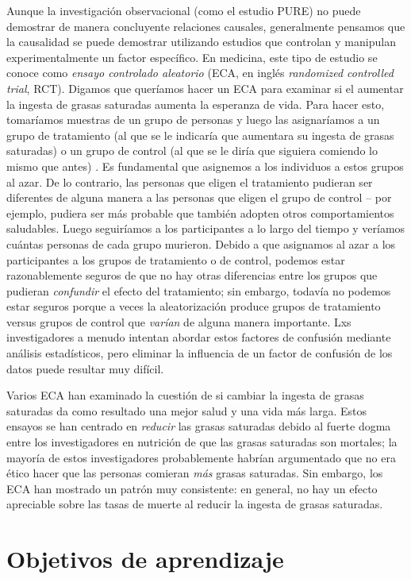 \documentclass[
  12pt,
]{book}
\begin{document}
Aunque la investigación observacional (como el estudio PURE) no puede demostrar de manera concluyente relaciones causales, generalmente pensamos que la causalidad se puede demostrar utilizando estudios que controlan y manipulan experimentalmente un factor específico. En medicina, este tipo de estudio se conoce como \emph{ensayo controlado aleatorio} (ECA, en inglés \emph{randomized controlled trial}, RCT). Digamos que queríamos hacer un ECA para examinar si el aumentar la ingesta de grasas saturadas aumenta la esperanza de vida. Para hacer esto, tomaríamos muestras de un grupo de personas y luego las asignaríamos a un grupo de tratamiento (al que se le indicaría que aumentara su ingesta de grasas saturadas) o un grupo de control (al que se le diría que siguiera comiendo lo mismo que antes) . Es fundamental que asignemos a los individuos a estos grupos al azar. De lo contrario, las personas que eligen el tratamiento pudieran ser diferentes de alguna manera a las personas que eligen el grupo de control -- por ejemplo, pudiera ser más probable que también adopten otros comportamientos saludables. Luego seguiríamos a los participantes a lo largo del tiempo y veríamos cuántas personas de cada grupo murieron. Debido a que asignamos al azar a los participantes a los grupos de tratamiento o de control, podemos estar razonablemente seguros de que no hay otras diferencias entre los grupos que pudieran \emph{confundir} el efecto del tratamiento; sin embargo, todavía no podemos estar seguros porque a veces la aleatorización produce grupos de tratamiento versus grupos de control que \emph{varían} de alguna manera importante. Lxs investigadores a menudo intentan abordar estos factores de confusión mediante análisis estadísticos, pero eliminar la influencia de un factor de confusión de los datos puede resultar muy difícil.

Varios ECA han examinado la cuestión de si cambiar la ingesta de grasas saturadas da como resultado una mejor salud y una vida más larga. Estos ensayos se han centrado en \emph{reducir} las grasas saturadas debido al fuerte dogma entre los investigadores en nutrición de que las grasas saturadas son mortales; la mayoría de estos investigadores probablemente habrían argumentado que no era ético hacer que las personas comieran \emph{más} grasas saturadas. Sin embargo, los ECA han mostrado un patrón muy consistente: en general, no hay un efecto apreciable sobre las tasas de muerte al reducir la ingesta de grasas saturadas.

\hypertarget{objetivos-de-aprendizaje}{%
\section{Objetivos de aprendizaje}\label{objetivos-de-aprendizaje}}
\end{document}
